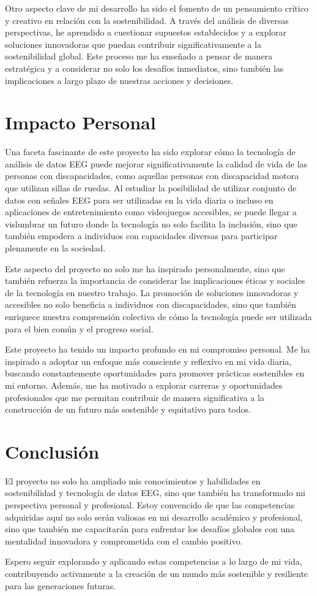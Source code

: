 Otro aspecto clave de mi desarrollo ha sido el fomento de un pensamiento crítico y creativo en relación con la sostenibilidad. A través del análisis de diversas perspectivas, he aprendido a cuestionar supuestos establecidos y a explorar soluciones innovadoras que puedan contribuir significativamente a la sostenibilidad global. Este proceso me ha enseñado a pensar de manera estratégica y a considerar no solo los desafíos inmediatos, sino también las implicaciones a largo plazo de nuestras acciones y decisiones.


\section{Impacto Personal}

Una faceta fascinante de este proyecto ha sido explorar cómo la tecnología de análisis de datos EEG puede mejorar significativamente la calidad de vida de las personas con discapacidades, como aquellas personas con discapacidad motora que utilizan sillas de ruedas. Al estudiar la posibilidad de utilizar conjunto de datos con señales EEG para ser utilizadas en la vida diaria o incluso en aplicaciones de entretenimiento como videojuegos accesibles, se puede llegar a vislumbrar un futuro donde la tecnología no solo facilita la inclusión, sino que también empodera a individuos con capacidades diversas para participar plenamente en la sociedad.

Este aspecto del proyecto no solo me ha inspirado personalmente, sino que también refuerza la importancia de considerar las implicaciones éticas y sociales de la tecnología en nuestro trabajo. La promoción de soluciones innovadoras y accesibles no solo beneficia a individuos con discapacidades, sino que también enriquece nuestra comprensión colectiva de cómo la tecnología puede ser utilizada para el bien común y el progreso social.


Este proyecto ha tenido un impacto profundo en mi compromiso personal. Me ha inspirado a adoptar un enfoque más consciente y reflexivo en mi vida diaria, buscando constantemente oportunidades para promover prácticas sostenibles en mi entorno. Además, me ha motivado a explorar carreras y oportunidades profesionales que me permitan contribuir de manera significativa a la construcción de un futuro más sostenible y equitativo para todos.

\section{Conclusión}

El proyecto no solo ha ampliado mis conocimientos y habilidades en sostenibilidad y tecnología de datos EEG, sino que también ha transformado mi perspectiva personal y profesional. Estoy convencido de que las competencias adquiridas aquí no solo serán valiosas en mi desarrollo académico y profesional, sino que también me capacitarán para enfrentar los desafíos globales con una mentalidad innovadora y comprometida con el cambio positivo. 

Espero seguir explorando y aplicando estas competencias a lo largo de mi vida, contribuyendo activamente a la creación de un mundo más sostenible y resiliente para las generaciones futuras.

